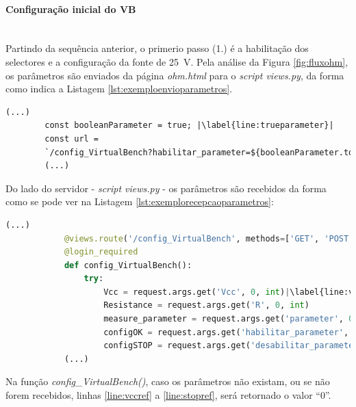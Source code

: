 \paragraph{Configuração inicial do VB} ~\\
Partindo da sequência anterior, o primerio passo (1.) é a habilitação dos selectores e a configuração da fonte de \SI{25}{\volt}. Pela análise da Figura \ref{fig:fluxohm}, os parâmetros são enviados da página \textit{ohm.html} para o \textit{script views.py}, da forma como indica a Listagem \ref{lst:exemploenvioparametros}.

\begin{center}
	\begin{minipage}{0.7\linewidth}
		\begin{lstlisting}[language=Html,escapechar=|, caption=Envio de parâmetros da página \textit{ohm.html} para o \textit{script views.py}, label=lst:exemploenvioparametros]
		(...)
		const booleanParameter = true; |\label{line:trueparameter}|
		const url = 
		`/config_VirtualBench?habilitar_parameter=${booleanParameter.toString()}`
		(...)
	\end{lstlisting}
	\end{minipage}
\end{center}

Do lado do servidor - \textit{script views.py} - os parâmetros são recebidos da forma como se pode ver na Listagem \ref{lst:exemplorecepcaoparametros}:
\begin{center}
	\begin{minipage}{1\linewidth}
		\begin{lstlisting}[language=Python,escapechar=|, caption=Recepção dos parâmetros no \textit{script views.py} enviados da página \textit{ohm.html}, label=lst:exemplorecepcaoparametros]
			(...)
			@views.route('/config_VirtualBench', methods=['GET', 'POST'])
			@login_required
			def config_VirtualBench():
				try:
					Vcc = request.args.get('Vcc', 0, int)|\label{line:vccref}|
					Resistance = request.args.get('R', 0, int)
					measure_parameter = request.args.get('parameter', 0, str)
					configOK = request.args.get('habilitar_parameter', 0, bool)
					configSTOP = request.args.get('desabilitar_parameter', 0, bool)|\label{line:stopref}|
			(...)
		\end{lstlisting}
	\end{minipage}
\end{center}

Na função \textit{config\_VirtualBench()}, caso os parâmetros não existam, ou se não forem recebidos, linhas \ref{line:vccref} a \ref{line:stopref}, será retornado o valor ``0''.

